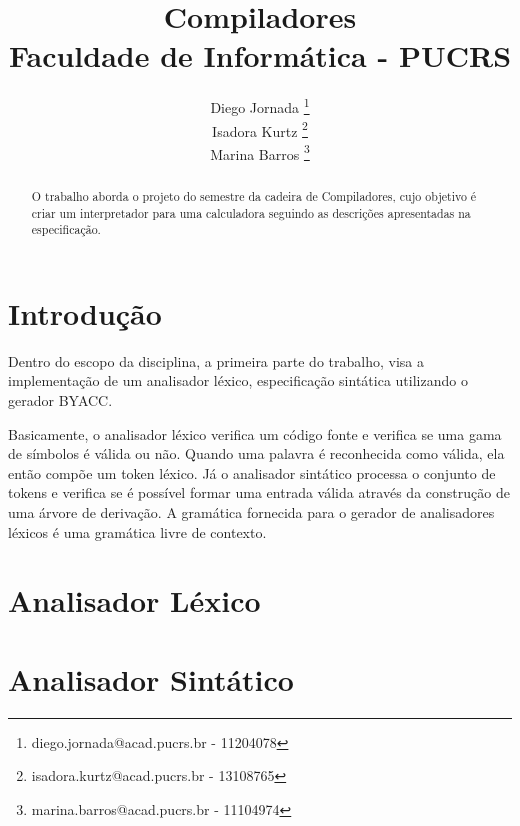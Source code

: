 \documentclass[12pt]{article}
\title{Compiladores\\Faculdade de Informática - PUCRS}
\author{
Diego Jornada \footnote{diego.jornada@acad.pucrs.br - 11204078} \\ 
Isadora Kurtz \footnote{isadora.kurtz@acad.pucrs.br - 13108765} \\
Marina Barros \footnote{marina.barros@acad.pucrs.br - 11104974} \\
}
\begin{document}
\maketitle

\begin{abstract}

O trabalho aborda o projeto do semestre da cadeira de Compiladores, cujo objetivo é criar um interpretador para uma calculadora seguindo as descrições apresentadas na especificação. 


\end{abstract}



\section{Introdução}
Dentro do escopo da disciplina, a primeira parte do trabalho, visa a implementação de um analisador léxico, especificação sintática utilizando o gerador BYACC. 

Basicamente, o analisador léxico verifica um código fonte e verifica se uma gama de símbolos é válida ou não. Quando uma palavra é reconhecida como válida, ela então compõe um token léxico. Já o analisador sintático processa o conjunto de tokens e verifica se é possível formar uma entrada válida através da construção de uma árvore de derivação. A gramática fornecida para o gerador de analisadores léxicos é uma gramática livre de contexto.

\section{Analisador Léxico}


\section{Analisador Sintático}
\end{document}
